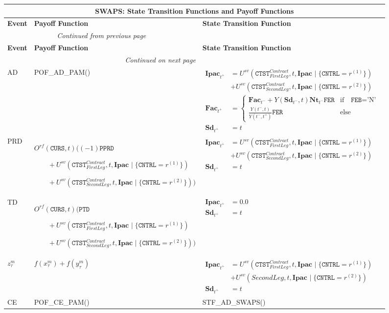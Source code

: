 \documentclass[9pt,oneside]{amsart}
\newenvironment{functions}[1]{
	\hfill %
    	\begin{longtable}{| p{0.05\textwidth} | p{0.42\textwidth} |  p{0.48\textwidth} |}
	\multicolumn{3}{c}{\textbf{#1: State Transition Functions and Payoff Functions}}\\
	\hline
	\textbf{Event} & \textbf{Payoff Function} & \textbf{State Transition Function}\\
	\hline
	\endfirsthead
	\multicolumn{2}{c}{\textit{Continued from previous page}} \\
	\hline
	\textbf{Event} & \textbf{Payoff Function} & \textbf{State Transition Function}\\
	\hline
	\endhead
	\hline \multicolumn{2}{r}{\textit{Continued on next page}} \\
	\endfoot
	\endlastfoot
}{%
	\hline
    	\end{longtable}
}
\newcommand{\svar}[2]{\textbf{#1}_{#2}}
\newcommand{\attr}[1]{\texttt{#1}}
\newcommand{\stf}[2]{STF\_#1\_#2()}
\newcommand{\pof}[2]{POF\_#1\_#2()}
\newcommand{\yfr}[2]{Y(#1,#2)}
\newcommand{\obs}[3]{O^{#1}(#2,#3)}
\newcommand{\cldsv}[4]{U^{sv}(#1,#2,\svar{#3}{} \mid\{#4\})}
\newcommand{\fev}[1]{f(#1)}
\begin{document}
\begin{functions}{SWAPS}
	AD & \pof{AD}{PAM} & {$\begin{aligned}
				\svar{Ipac}{t^+} &= \cldsv{\attr{CTST}_{FirstLeg}^{Contract}}{t}{Ipac}{\attr{CNTRL}=r^{(1)}} \\
						&+ \cldsv{\attr{CTST}_{SecondLeg}^{Contract}}{t}{Ipac}{\attr{CNTRL}=r^{(2)}} \\
				\svar{Fac}{t^+} &= \begin{cases} \svar{Fac}{t^-} + \yfr{\svar{Sd}{t^-}}{t}\svar{Nt}{t^-}\attr{FER} & \text{if} \quad \attr{FEB}=\text{'N'} \\
					\frac{\yfr{t^-}{t}}{\yfr{t^-}{t^+}}\attr{FER} & \text{else} \end{cases} \\
				\svar{Sd}{t^+} &= t \end{aligned}$} \\
	\hline
	PRD & $\obs{rf}{\attr{CURS}}{t} ( (-1)\attr{PPRD}$ \par
				 $\qquad + \cldsv{\attr{CTST}_{FirstLeg}^{Contract}}{t}{Ipac}{\attr{CNTRL}=r^{(1)}}$ \par
				 $\qquad + \cldsv{\attr{CTST}_{SecondLeg}^{Contract}}{t}{Ipac}{\attr{CNTRL}=r^{(2)}})$
		& {$\begin{aligned}
				\svar{Ipac}{t^+} &= \cldsv{\attr{CTST}_{FirstLeg}^{Contract}}{t}{Ipac}{\attr{CNTRL}=r^{(1)}} \\
						&+ \cldsv{\attr{CTST}_{SecondLeg}^{Contract}}{t}{Ipac}{\attr{CNTRL}=r^{(2)}} \\
				\svar{Sd}{t^+} &= t \end{aligned}$} \\
	\hline
	TD & $\obs{rf}{\attr{CURS}}{t} (\attr{PTD}$ \par
				 $\qquad + \cldsv{\attr{CTST}_{FirstLeg}^{Contract}}{t}{Ipac}{\attr{CNTRL}=r^{(1)}}$ \par
				 $\qquad + \cldsv{\attr{CTST}_{SecondLeg}^{Contract}}{t}{Ipac}{\attr{CNTRL}=r^{(2)}})$
		& {$\begin{aligned}
				\svar{Ipac}{t^+} &= 0.0 \\
				\svar{Sd}{t^+} &= t \end{aligned}$} \\
	\hline
	$z_\tau^m$ & $\fev{x_\tau^m}+\fev{y_\tau^m}$
		& {$\begin{aligned}
				\svar{Ipac}{t^+} &= \cldsv{\attr{CTST}_{FirstLeg}^{Contract}}{t}{Ipac}{\attr{CNTRL}=r^{(1)}} \\						&+ \cldsv{SecondLeg}{t}{Ipac}{\attr{CNTRL}=r^{(2)}} \\
				\svar{Sd}{t^+} &= t \end{aligned}$} \\
	\hline
	CE & \pof{CE}{PAM} & \stf{AD}{SWAPS} \\
\end{functions}
\end{document}
